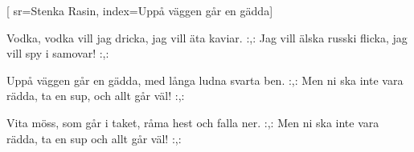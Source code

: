 [ 							
	sr={Stenka Rasin},					
	index={Uppå väggen går en gädda}]		
	
\beginverse*						
Vodka, vodka vill jag dricka,
jag vill äta kaviar.
:,: Jag vill älska russki flicka,
jag vill spy i samovar! :,:
\endverse						

\beginverse				
Uppå väggen går en gädda, 
med långa ludna svarta ben.
:,: Men ni ska inte vara rädda,
ta en sup, och allt går väl! :,:
\endverse
				
\beginverse				
Vita möss, som går i taket,
råma hest och falla ner.
:,: Men ni ska inte vara rädda, 
ta en sup och allt går väl! :,:
\endverse	
\endsong	
